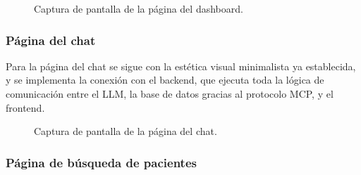 \begin{figure}[H]
  \centering
  \caption{Captura de pantalla de la página del dashboard.}
  \label{fig:dash}
\end{figure}

\subsubsection{Página del chat}

Para la página del chat se sigue con la estética visual minimalista ya establecida, y se implementa la conexión con el backend, que ejecuta toda la lógica de comunicación entre el LLM, la base de datos gracias al protocolo MCP, y el frontend.

\begin{figure}[H]
  \centering
  \caption{Captura de pantalla de la página del chat.}
  \label{fig:chat}
\end{figure}

\subsubsection{Página de búsqueda de pacientes}

